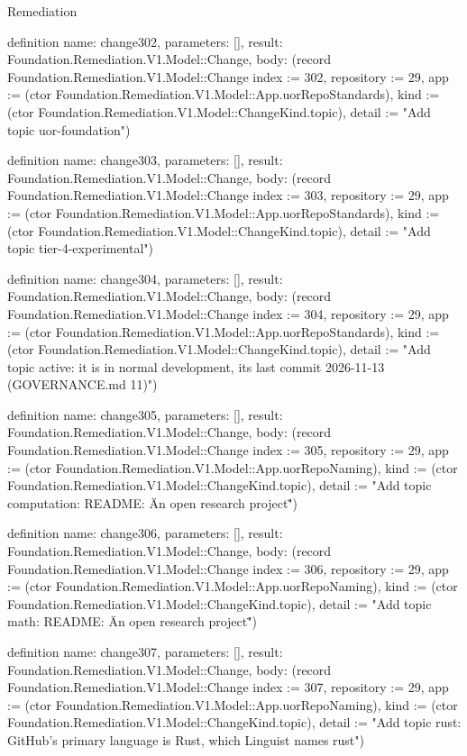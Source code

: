 \begin{lexlean}{Remediation}
\begin{semanticmodule}
definition{
  name: change302,
  parameters: [],
  result: Foundation.Remediation.V1.Model::Change,
  body: (record Foundation.Remediation.V1.Model::Change {index := 302, repository := 29, app := (ctor Foundation.Remediation.V1.Model::App.uorRepoStandards), kind := (ctor Foundation.Remediation.V1.Model::ChangeKind.topic), detail := "Add topic uor-foundation"})
}

definition{
  name: change303,
  parameters: [],
  result: Foundation.Remediation.V1.Model::Change,
  body: (record Foundation.Remediation.V1.Model::Change {index := 303, repository := 29, app := (ctor Foundation.Remediation.V1.Model::App.uorRepoStandards), kind := (ctor Foundation.Remediation.V1.Model::ChangeKind.topic), detail := "Add topic tier-4-experimental"})
}

definition{
  name: change304,
  parameters: [],
  result: Foundation.Remediation.V1.Model::Change,
  body: (record Foundation.Remediation.V1.Model::Change {index := 304, repository := 29, app := (ctor Foundation.Remediation.V1.Model::App.uorRepoStandards), kind := (ctor Foundation.Remediation.V1.Model::ChangeKind.topic), detail := "Add topic active: it is in normal development, its last commit 2026-11-13 (GOVERNANCE.md 11)"})
}

definition{
  name: change305,
  parameters: [],
  result: Foundation.Remediation.V1.Model::Change,
  body: (record Foundation.Remediation.V1.Model::Change {index := 305, repository := 29, app := (ctor Foundation.Remediation.V1.Model::App.uorRepoNaming), kind := (ctor Foundation.Remediation.V1.Model::ChangeKind.topic), detail := "Add topic computation: README: \"An open research project\""})
}

definition{
  name: change306,
  parameters: [],
  result: Foundation.Remediation.V1.Model::Change,
  body: (record Foundation.Remediation.V1.Model::Change {index := 306, repository := 29, app := (ctor Foundation.Remediation.V1.Model::App.uorRepoNaming), kind := (ctor Foundation.Remediation.V1.Model::ChangeKind.topic), detail := "Add topic math: README: \"An open research project\""})
}

definition{
  name: change307,
  parameters: [],
  result: Foundation.Remediation.V1.Model::Change,
  body: (record Foundation.Remediation.V1.Model::Change {index := 307, repository := 29, app := (ctor Foundation.Remediation.V1.Model::App.uorRepoNaming), kind := (ctor Foundation.Remediation.V1.Model::ChangeKind.topic), detail := "Add topic rust: GitHub's primary language is Rust, which Linguist names rust"})
}


\end{semanticmodule}
\end{lexlean}
